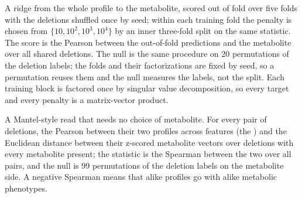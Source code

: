  A ridge from the whole profile to the metabolite, scored out of
fold over five folds with the deletions shuffled once by seed; within each training
fold the penalty is chosen from $\{10, 10^2, 10^3, 10^4\}$ by an inner three-fold split
on the same statistic. The score is the Pearson between the out-of-fold predictions and
the metabolite over all shared deletions. The null is the same procedure on 20
permutations of the deletion labels; the folds and their factorizations are fixed by
seed, so a permutation reuses them and the null measures the labels, not the split.
Each training block is factored once by singular value decomposition, so every target
and every penalty is a matrix-vector product.

 A Mantel-style read that needs no choice of metabolite. For every
pair of deletions, the Pearson between their two profiles across features (the
) and the Euclidean distance between their z-scored metabolite
vectors over deletions with every metabolite present; the statistic is the Spearman
between the two over all pairs, and the null is 99 permutations of the deletion labels
on the metabolite side. A negative Spearman means that alike profiles go with alike
metabolic phenotypes.
